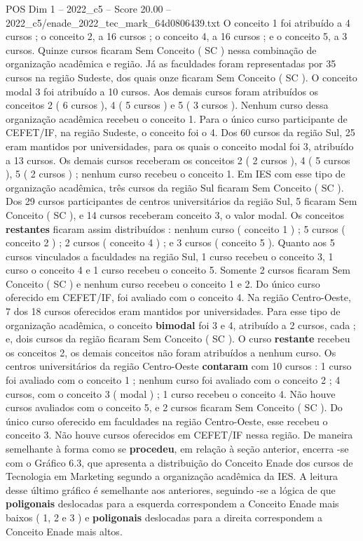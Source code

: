 \begin{textsample}{POS Dim 1 – 2022\_c5 – Score 20.00 – 2022\_c5/enade\_2022\_tec\_mark\_64d0806439.txt}
O conceito 1 foi atribuído a 4 cursos ; o conceito 2, a 16 cursos ; o conceito 4, a 16 cursos ; e o conceito 5, a 3 cursos.
Quinze cursos ficaram Sem Conceito ( SC ) nessa combinação de organização acadêmica e região.
Já as faculdades foram representadas por 35 cursos na região Sudeste, dos quais onze ficaram Sem Conceito ( SC ).
O conceito modal 3 foi atribuído a 10 cursos.
Aos demais cursos foram atribuídos os conceitos 2 ( 6 cursos ), 4 ( 5 cursos ) e 5 ( 3 cursos ).
Nenhum curso dessa organização acadêmica recebeu o conceito 1.
Para o único curso participante de CEFET/IF, na região Sudeste, o conceito foi o 4.
Dos 60 cursos da região Sul, 25 eram mantidos por universidades, para os quais o conceito modal foi 3, atribuído a 13 cursos.
Os demais cursos receberam os conceitos 2 ( 2 cursos ), 4 ( 5 cursos ), 5 ( 2 cursos ) ; nenhum curso recebeu o conceito 1.
Em IES com esse tipo de organização acadêmica, três cursos da região Sul ficaram Sem Conceito ( SC ).
Dos 29 cursos participantes de centros universitários da região Sul, 5 ficaram Sem Conceito ( SC ), e 14 cursos receberam conceito 3, o valor modal.
Os conceitos \textbf{restantes} ficaram assim distribuídos : nenhum curso ( conceito 1 ) ; 5 cursos ( conceito 2 ) ; 2 cursos ( conceito 4 ) ; e 3 cursos ( conceito 5 ).
Quanto aos 5 cursos vinculados a faculdades na região Sul, 1 curso recebeu o conceito 3, 1 curso o conceito 4 e 1 curso recebeu o conceito 5.
Somente 2 cursos ficaram Sem Conceito ( SC ) e nenhum curso recebeu o conceito 1 e 2.
Do único curso oferecido em CEFET/IF, foi avaliado com o conceito 4.
Na região Centro-Oeste, 7 dos 18 cursos oferecidos eram mantidos por universidades.
Para esse tipo de organização acadêmica, o conceito \textbf{bimodal} foi 3 e 4, atribuído a 2 cursos, cada ; e, dois cursos da região ficaram Sem Conceito ( SC ).
O curso \textbf{restante} recebeu os conceitos 2, os demais conceitos não foram atribuídos a nenhum curso.
Os centros universitários da região Centro-Oeste \textbf{contaram} com 10 cursos : 1 curso foi avaliado com o conceito 1 ; nenhum curso foi avaliado com o conceito 2 ; 4 cursos, com o conceito 3 ( modal ) ; 1 curso recebeu o conceito 4.
Não houve cursos avaliados com o conceito 5, e 2 cursos ficaram Sem Conceito ( SC ).
Do único curso oferecido em faculdades na região Centro-Oeste, esse recebeu o conceito 3.
Não houve cursos oferecidos em CEFET/IF nessa região.
De maneira semelhante à forma como se \textbf{procedeu}, em relação à seção anterior, encerra -se com o Gráfico 6.3, que apresenta a distribuição do Conceito Enade dos cursos de Tecnologia em Marketing segundo a organização acadêmica da IES.
A leitura desse último gráfico é semelhante aos anteriores, seguindo -se a lógica de que \textbf{poligonais} deslocadas para a esquerda correspondem a Conceito Enade mais baixos ( 1, 2 e 3 ) e \textbf{poligonais} deslocadas para a direita correspondem a Conceito Enade mais altos.

\end{textsample}
